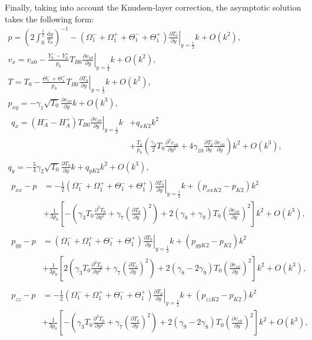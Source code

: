 \documentclass[]{jfm}
\newcommand{\dd}{\mathrm{d}}
\newcommand{\pder}[2][]{\frac{\partial#1}{\partial#2}}
\newcommand{\pderdual}[2][]{\frac{\partial^2#1}{\partial#2^2}}
\newcommand{\OO}[1]{O(#1)}
\begin{document}
Finally, taking into account the Knudsen-layer correction, the asymptotic solution takes the following form:
\begin{gather}
    p = \left( 2\int_{0}^\frac12\frac{\dd{y}}{T_0} \right)^{-1}
        - (\Omega_1^-+\Omega_1^+ + \Theta_1^-+\Theta_1^+)\left.\pder[T_0]{y}\right|_{y=\frac12}k + \OO{k^2}, \label{eq:Hilbert_p}\\
    v_x = v_{x0} - \frac{Y_0^--Y_0^+}{p_0}T_{B0}\left.\pder[v_{x0}]{y}\right|_{y=\frac12}k + \OO{k^2}, \label{eq:Hilbert_U}\\
    T = T_0 - \frac{\Theta_1^-+\Theta_1^+}{p_0}T_{B0}\left.\pder[T_0]{y}\right|_{y=\frac12}k + \OO{k^2}, \label{eq:Hilbert_T}\\
    p_{xy} = -\gamma_1\sqrt{T_0}\pder[v_{x0}]{y}k + \OO{k^3}, \label{eq:Hilbert_Pxy}\\
    \begin{aligned}
        q_x = (H_A^--H_A^+)T_{B0}\left.\pder[v_{x0}]{y}\right|_{y=\frac12}k &+ q_{xK2}k^2 \\
        &+ \frac{T_0}{p_0}\left(\frac{\gamma_3}2 T_0 \pderdual[v_{x0}]{y}
        + 4\gamma_{10} \pder[T_0]{y}\pder[v_{x0}]{y}\right)k^2 + \OO{k^3},
    \end{aligned}\label{eq:Hilbert_Qx}\\
    q_y = -\frac54\gamma_2\sqrt{T_0}\pder[T_0]{y}k + q_{yK2}k^2 + \OO{k^3}, \label{eq:Hilbert_Qy}\\
    \begin{aligned}
    p_{xx} - p &= -\frac12 (\Omega_1^-+\Omega_1^+ + \Theta_1^-+\Theta_1^+)\left.\pder[T_0]{y}\right|_{y=\frac12}k
        + (p_{xxK2}-p_{K2})k^2 \\
        &+ \frac1{3p_0}\left[-\left(\gamma_3 T_0 \pderdual[T_0]{y} + \gamma_7\left(\pder[T_0]{y}\right)^2\right)
        + 2(\gamma_8+\gamma_9)T_0\left(\pder[v_{x0}]{y}\right)^2\right]k^2 + \OO{k^3},
    \end{aligned}\label{eq:Hilbert_Pxx}\\
    \begin{aligned}
    p_{yy} - p &= (\Omega_1^-+\Omega_1^+ + \Theta_1^-+\Theta_1^+)\left.\pder[T_0]{y}\right|_{y=\frac12}k
        + (p_{yyK2}-p_{K2})k^2 \\
        &+ \frac1{3p_0}\left[2\left(\gamma_3 T_0 \pderdual[T_0]{y} + \gamma_7\left(\pder[T_0]{y}\right)^2\right)
        + 2(\gamma_8-2\gamma_9)T_0\left(\pder[v_{x0}]{y}\right)^2\right]k^2 + \OO{k^3},
    \end{aligned}\label{eq:Hilbert_Pyy}\\
    \begin{aligned}
    p_{zz} - p &= -\frac12 (\Omega_1^-+\Omega_1^+ + \Theta_1^-+\Theta_1^+)\left.\pder[T_0]{y}\right|_{y=\frac12}k
        + (p_{zzK2}-p_{K2})k^2 \\
        &+ \frac1{3p_0}\left[-\left(\gamma_3 T_0 \pderdual[T_0]{y} + \gamma_7\left(\pder[T_0]{y}\right)^2\right)
        + 2(\gamma_9-2\gamma_8)T_0\left(\pder[v_{x0}]{y}\right)^2\right]k^2 + \OO{k^3},
    \end{aligned}\label{eq:Hilbert_Pzz}
\end{gather}
\end{document}
